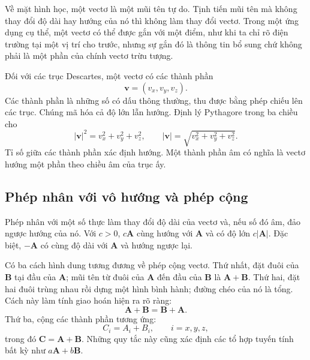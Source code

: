 Về mặt hình học, một vectơ là một mũi tên tự do. Tịnh tiến mũi tên mà không thay đổi độ dài hay hướng của nó thì không làm thay đổi vectơ. Trong một ứng dụng cụ thể, một vectơ có thể được gắn với một điểm, như khi ta chỉ rõ điện trường tại một vị trí cho trước, nhưng sự gắn đó là thông tin bổ sung chứ không phải là một phần của chính vectơ trừu tượng.

Đối với các trục Descartes, một vectơ có các thành phần
\begin{equation}
  \mathbf v=(v_x,v_y,v_z).
\end{equation}
Các thành phần là những số có dấu thông thường, thu được bằng phép chiếu lên các trục. Chúng mã hóa cả độ lớn lẫn hướng. Định lý Pythagore trong ba chiều cho
\begin{equation}
  \lvert\mathbf v\rvert^2
  =v_x^2+v_y^2+v_z^2,
  \qquad
  \lvert\mathbf v\rvert
  =\sqrt{v_x^2+v_y^2+v_z^2}.
  \label{eq:vector-magnitude}
\end{equation}
Tỉ số giữa các thành phần xác định hướng. Một thành phần âm có nghĩa là vectơ hướng một phần theo chiều âm của trục ấy.

\subsection{Phép nhân với vô hướng và phép cộng}

Phép nhân với một số thực làm thay đổi độ dài của vectơ và, nếu số đó âm, đảo ngược hướng của nó. Với \(c>0\), \(c\mathbf A\) cùng hướng với \(\mathbf A\) và có độ lớn \(c\lvert\mathbf A\rvert\). Đặc biệt, \(-\mathbf A\) có cùng độ dài với \(\mathbf A\) và hướng ngược lại.

Có ba cách hình dung tương đương về phép cộng vectơ. Thứ nhất, đặt đuôi của \(\mathbf B\) tại đầu của \(\mathbf A\); mũi tên từ đuôi của \(\mathbf A\) đến đầu của \(\mathbf B\) là \(\mathbf A+\mathbf B\).
Thứ hai, đặt hai đuôi trùng nhau rồi dựng một hình bình hành; đường chéo của nó là tổng. Cách này làm tính giao hoán hiện ra rõ ràng:
\begin{equation}
  \mathbf A+\mathbf B=\mathbf B+\mathbf A.
\end{equation}
Thứ ba, cộng các thành phần tương ứng:
\begin{equation}
  C_i=A_i+B_i,
  \qquad i=x,y,z,
  \label{eq:component-addition}
\end{equation}
trong đó \(\mathbf C=\mathbf A+\mathbf B\). Những quy tắc này cũng xác định các tổ hợp tuyến tính bất kỳ như \(a\mathbf A+b\mathbf B\).

